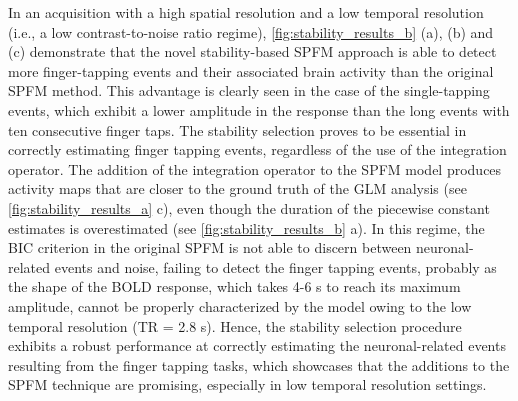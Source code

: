 In an acquisition with a high spatial resolution and a low temporal resolution
(i.e., a low contrast-to-noise ratio regime), \cref{fig:stability_results_b}
(a), (b) and (c) demonstrate that the novel stability-based SPFM approach is
able to detect more finger-tapping events and their associated brain activity
than the original SPFM method. This advantage is clearly seen in the case of the
single-tapping events, which exhibit a lower amplitude in the response than the
long events with ten consecutive finger taps. The stability selection proves to
be essential in correctly estimating finger tapping events, regardless of the
use of the integration operator. The addition of the integration operator to the
SPFM model produces activity maps that are closer to the ground truth of the GLM
analysis (see \cref{fig:stability_results_a} c), even though the duration of
the piecewise constant estimates is overestimated (see
\cref{fig:stability_results_b} a). In this regime, the BIC criterion in the
original SPFM is not able to discern between neuronal-related events and noise,
failing to detect the finger tapping events, probably as the shape of the BOLD
response, which takes 4-6 s to reach its maximum amplitude, cannot be properly
characterized by the model owing to the low temporal resolution (TR = 2.8 s).
Hence, the stability selection procedure exhibits a robust performance at
correctly estimating the neuronal-related events resulting from the finger
tapping tasks, which showcases that the additions to the SPFM technique are
promising, especially in low temporal resolution settings.